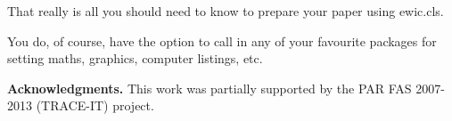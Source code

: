 \documentclass{ewic}
\begin{document}
That really is all you should need to know to prepare your paper
using ewic.cls.\citep{Mills2003}

You do, of course, have the option to call in any of your
favourite packages for setting maths, graphics, computer listings,
etc.

\textbf{Acknowledgments. }
This work was partially supported by the PAR FAS 2007-2013 (TRACE-IT) project.

%
%
%
%



\end{document}
